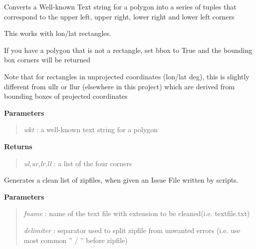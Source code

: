 \documentclass[letterpaper,10pt,openany,oneside]{sphinxmanual}
\begin{document}
\begin{fulllineitems}
\label{code:Util.wktpoly2pts}
Converts a Well-known Text string for a polygon into a series of tuples that
correspond to the upper left, upper right, lower right and lower left corners

This works with lon/lat rectangles.

If you have a polygon that is not a rectangle, set bbox to True and the 
bounding box corners will be returned

Note that for rectangles in unprojected coordinates (lon/lat deg), this is 
slightly different from ullr or llur (elsewhere in this project) which are 
derived from bounding boxes of projected coordinates

\textbf{Parameters}
\begin{quote}

\emph{wkt}         : a well-known text string for a polygon
\end{quote}

\textbf{Returns}
\begin{quote}

\emph{ul,ur,lr,ll} : a list of the four corners
\end{quote}

\end{fulllineitems}


\begin{fulllineitems}
\label{code:Util.writeIssueFile}
Generates a clean list of zipfiles, when given an Issue File written by scripts.

\textbf{Parameters}
\begin{quote}

\emph{fname}     :   name of the text file with extension to be cleaned(i.e. textfile.txt)

\emph{delimiter} :   separator used to split zipfile from unwanted errors (i.e. use most common '' / '' before zipfile)
\end{quote}

\end{fulllineitems}
\end{document}
